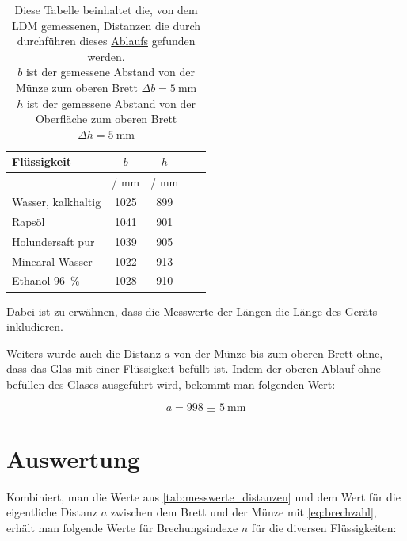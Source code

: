 \documentclass[11pt,ngerman]{scrartcl}
\begin{document}
\begin{table}[H]
    \centering
    \caption{
        Diese Tabelle beinhaltet die, von dem LDM gemessenen, Distanzen die
        durch durchführen dieses \hyperref[en:Ablauf]{Ablaufs} gefunden werden.\\ 
        $b$ ist der gemessene Abstand von der Münze zum oberen Brett $\Delta b=\SI{5}{\mm}$ \\
        $h$ ist der gemessene Abstand von der Oberfläche zum oberen Brett $\Delta h = \SI{5}{\mm}$\\
    }
    \label{tab:messwerte_distanzen}
    \begin{tabular}{l|S|S|S|S}
        Flüssigkeit        & {$b$}        & {$h$}        \\ \hline
        {}                 & {/ \si{\mm}} & {/ \si{\mm}} \\ \hline \hline
        Wasser, kalkhaltig & 1025         & 899          \\
        Rapsöl             & 1041         & 901          \\
        Holundersaft pur   & 1039         & 905          \\
        Minearal Wasser    & 1022         & 913          \\
        Ethanol \SI{96}{\percent} & 1028         & 910          \\
    \end{tabular}
\end{table}

Dabei ist zu erwähnen, dass die Messwerte der Längen die Länge des Geräts inkludieren.

Weiters wurde auch die Distanz $a$ von der Münze bis zum oberen Brett ohne, dass das Glas
mit einer Flüssigkeit befüllt ist. Indem der oberen \hyperref[en:Ablauf]{Ablauf}
ohne befüllen des Glases ausgeführt wird, bekommt man folgenden Wert:

\begin{equation}
    a = \SI{998(5)}{\mm}
\end{equation}



\section{Auswertung}
\label{sec:auswertung}

Kombiniert, man die Werte aus \autoref{tab:messwerte_distanzen} und dem Wert für die
eigentliche Distanz $a$ zwischen dem Brett und der Münze mit
\autoref{eq:brechzahl}, erhält man folgende Werte für Brechungsindexe $n$ für die
diversen Flüssigkeiten:
\end{document}
